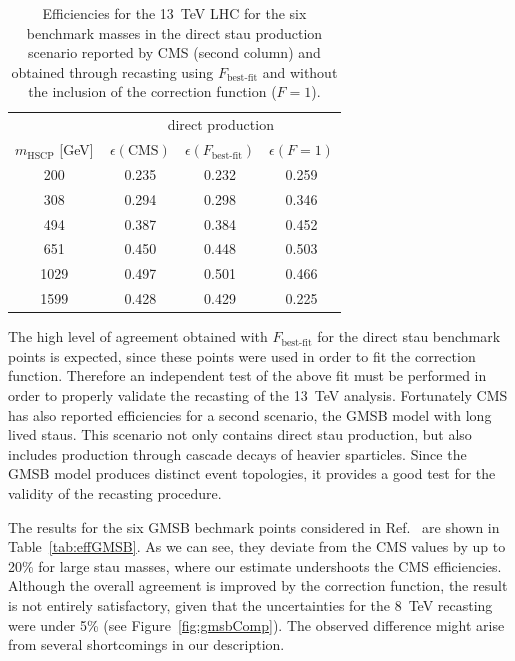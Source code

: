 \begin{table}[t]
\footnotesize
 \begin{center}
\begin{tabular}{c|ccc}
 & \multicolumn{3}{c}{direct production } \\
$m_\text{HSCP}$ [{\rm GeV}] & \,$\epsilon(\text{CMS})$ & $\epsilon(F_\text{best-fit})$& $\epsilon(F=1)$ \\
\hline
200   & \,0.235 & 0.232 & 0.259  \\
308   & \,0.294 & 0.298  & 0.346  \\
494    & \,0.387 & 0.384  & 0.452  \\
651  & \,0.450  & 0.448   & 0.503 \\
1029 & \,0.497 & 0.501  & 0.466 \\
1599 & \,0.428 & 0.429  & 0.225  \\
\hline
\end{tabular}
\end{center}
\caption{Efficiencies for the 13~TeV LHC for the six benchmark masses in the direct stau production scenario
reported by CMS (second column) and obtained through recasting using
$F_\text{best-fit}$ and without the inclusion of the correction function ($F=1$).}
\label{tab:eff}
\end{table}

The high level of agreement obtained with $F_\text{best-fit}$
for the direct stau benchmark points is expected, since these points
were used in order to fit the correction function.
Therefore an independent test of the above fit
must be performed in order to properly validate the recasting of
the 13~TeV analysis.
Fortunately CMS has also reported efficiencies for a second scenario,
the GMSB model with long lived staus. This scenario not
only contains direct stau production, but also includes production
through cascade decays of heavier sparticles.
Since the GMSB model produces distinct event topologies, it
provides a good test for the validity of the recasting
procedure.

The results for the six GMSB bechmark points considered in
Ref.~\cite{CMS-PAS-EXO-16-036} are shown in Table~\ref{tab:effGMSB}. As we can
see, they deviate from the CMS values by up to 20\% for large
stau masses, where our estimate undershoots the CMS efficiencies.
Although the overall agreement is improved by the correction function,
the result is not entirely satisfactory, given that
the uncertainties for the 8~TeV recasting were
under 5\% (see Figure~\ref{fig:gmsbComp}).
The observed difference might arise from several shortcomings in our description.

